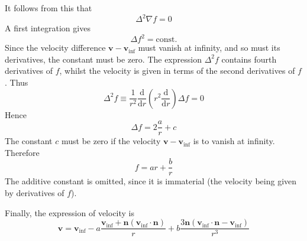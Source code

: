 \documentclass[conference]{IEEEtran}
\theoremstyle{definition}
\theoremstyle{remark}
\begin{document}
    It follows from this that
    \begin{equation}
        \Delta^2 \nabla f = 0
    \end{equation}
    A first integration gives
    \begin{equation}
        \Delta f^2 = \mathrm{const.}
    \end{equation}
    Since the velocity difference $\mathbf{v} - \mathbf{v}_\mathrm{inf}$ must vanish at infinity, and so must its derivatives, the constant must be zero. The expression $\Delta^2 f$ contains fourth derivatives of $f$, whilst the velocity is given in terms of the second derivatives of $f$. Thus
    \begin{equation*}
        \Delta^2 f \equiv \dfrac1{r^2} \dfrac{\mathrm{d}}{\mathrm{d} r} \left( r^2 \dfrac{\mathrm{d}}{\mathrm{d} r} \right) \Delta f = 0
    \end{equation*}
    Hence
    \[
        \Delta f = 2\dfrac{a}{r} + c
    \]
    The constant $c$ must be zero if the velocity $\mathbf{v} - \mathbf{v}_\mathrm{inf}$ is to vanish at infinity. Therefore
    \begin{equation}
        f = ar + \dfrac{b}{r}
    \end{equation}
    The additive constant is omitted, since it is immaterial (the velocity being given by derivatives of $f$).

    Finally, the expression of velocity is
    \begin{equation}
        \mathbf{v} = \mathbf{v}_\mathrm{inf} - a \dfrac{\mathbf{v}_\mathrm{inf} + \mathbf{n} (\mathbf{v}_\mathrm{inf} \cdot \mathbf{n})} r + b \dfrac{3\mathbf{n} (\mathbf{v}_\mathrm{inf} \cdot \mathbf{n} - \mathbf{v}_\mathrm{inf})}{r^3}
    \end{equation}
\end{document}
